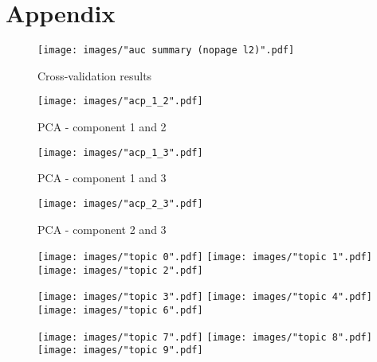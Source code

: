 \documentclass[a4paper]{article}
\begin{document}
	\section{Appendix}
	
	\begin{figure}[h]
		\centering
		\texttt{[image: images/"auc summary (nopage l2)".pdf]}
		\caption{Cross-validation results}
		\label{fig:auc summary}
	\end{figure}

	\begin{figure}[h]
		\centering
		\texttt{[image: images/"acp\_1\_2".pdf]}
		\caption{PCA - component 1 and 2}
		\label{fig:pca12}
	\end{figure}
	
	\begin{figure}[h]
		\centering
		\texttt{[image: images/"acp\_1\_3".pdf]}
		\caption{PCA - component 1 and 3}
		\label{fig:pca13}
	\end{figure}
	
	\begin{figure}[h]
		\centering
		\texttt{[image: images/"acp\_2\_3".pdf]}
		\caption{PCA - component 2 and 3}
		\label{fig:pca23}
	\end{figure}
	
	\begin{figure}[h]
		\texttt{[image: images/"topic 0".pdf]}
		\endminipage\hfill
		\texttt{[image: images/"topic 1".pdf]}
		\endminipage\hfill
		\texttt{[image: images/"topic 2".pdf]}
		\endminipage
	\end{figure}

	\begin{figure}[h]
		\texttt{[image: images/"topic 3".pdf]}
		\endminipage\hfill
		\texttt{[image: images/"topic 4".pdf]}
		\endminipage\hfill
		\texttt{[image: images/"topic 6".pdf]}
		\endminipage
	\end{figure}

	\begin{figure}[h]
		\texttt{[image: images/"topic 7".pdf]}
		\endminipage\hfill
		\texttt{[image: images/"topic 8".pdf]}
		\endminipage\hfill
		\texttt{[image: images/"topic 9".pdf]}
		\endminipage
	\end{figure}
\end{document}
